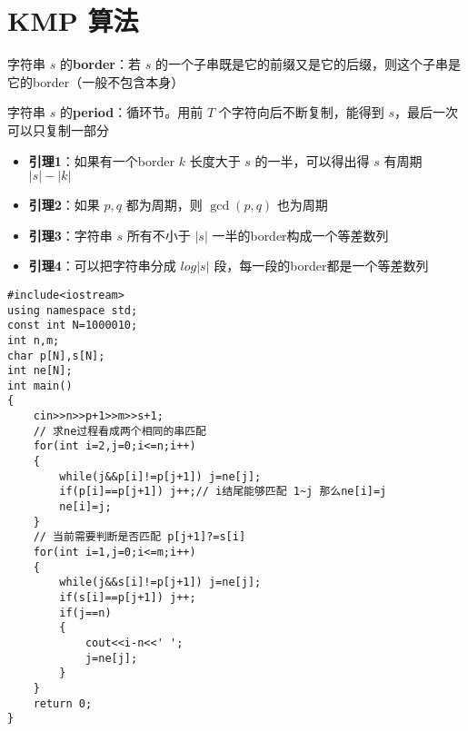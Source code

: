 \section{KMP 算法}
\par \noindent 字符串 $s$ 的\textbf{border}：若 $s$ 的一个子串既是它的前缀又是它的后缀，则这个子串是它的border（一般不包含本身）
~\\
\par \noindent 字符串 $s$ 的\textbf{period}：循环节。用前 $T$ 个字符向后不断复制，能得到 $s$，最后一次可以只复制一部分

\begin{itemize}
\item \textbf{引理1}：如果有一个border $k$ 长度大于 $s$ 的一半，可以得出得 $s$ 有周期 $|s|−|k|$
\item \textbf{引理2}：如果 $p,q$ 都为周期，则 $\gcd(p,q)$ 也为周期
\item \textbf{引理3}：字符串 $s$ 所有不小于 $|s|$ 一半的border构成一个等差数列
\item \textbf{引理4}：可以把字符串分成 $log|s|$ 段，每一段的border都是一个等差数列
\end{itemize}

\begin{verbatim}
#include<iostream>
using namespace std;
const int N=1000010;
int n,m;
char p[N],s[N];
int ne[N];
int main()
{
    cin>>n>>p+1>>m>>s+1;
    // 求ne过程看成两个相同的串匹配
    for(int i=2,j=0;i<=n;i++)
    {
        while(j&&p[i]!=p[j+1]) j=ne[j];
        if(p[i]==p[j+1]) j++;// i结尾能够匹配 1~j 那么ne[i]=j
        ne[i]=j;
    }
    // 当前需要判断是否匹配 p[j+1]?=s[i]
    for(int i=1,j=0;i<=m;i++)
    {
        while(j&&s[i]!=p[j+1]) j=ne[j];
        if(s[i]==p[j+1]) j++;
        if(j==n)
        {
            cout<<i-n<<' ';
            j=ne[j];
        }
    }
    return 0;
}
\end{verbatim}

